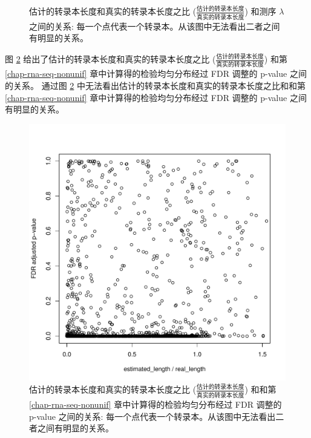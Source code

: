 \begin{figure}[!t]
\caption[估计的转录本长度和真实的转录本长度之比和测序 $\lambda$ 
之间的关系]
{估计的转录本长度和真实的转录本长度之比 
($\frac{\text{估计的转录本长度}}{\text{真实的转录本长度}}$) 
和测序 $\lambda$ 
之间的关系: 每一个点代表一个转录本。从该图中无法看出二者之间有明显的关系。}
\label{len-ratio-VS-lambda}
\end{figure}

图 \ref{len-ratio-VS-pval} 给出了估计的转录本长度和真实的转录本长度之比 
($\frac{\text{估计的转录本长度}}{\text{真实的转录本长度}}$) 和第 
\ref{chap-rna-seq-nonunif} 章中计算得的检验均匀分布经过 FDR 调整的 p-value 之间的关系。
通过图 \ref{len-ratio-VS-pval} 中无法看出估计的转录本长度和真实的转录本长度之比和和第 
\ref{chap-rna-seq-nonunif} 章中计算得的检验均匀分布经过 FDR 调整的 p-value 之间有明显的关系。

\begin{figure}[!t]
\centering
\includegraphics[width=\textwidth]{figures/lenest/len_ratio-VS-pval.pdf}
\caption[估计的转录本长度和真实的转录本长度之比和和第 
\ref{chap-rna-seq-nonunif} 章中计算得的检验均匀分布经过 FDR 调整的 p-value 
之间的关系]
{估计的转录本长度和真实的转录本长度之比 
($\frac{\text{估计的转录本长度}}{\text{真实的转录本长度}}$) 
和和第 \ref{chap-rna-seq-nonunif} 章中计算得的检验均匀分布经过 FDR 调整的 p-value 
之间的关系: 每一个点代表一个转录本。从该图中无法看出二者之间有明显的关系。}
\label{len-ratio-VS-pval}
\end{figure}



